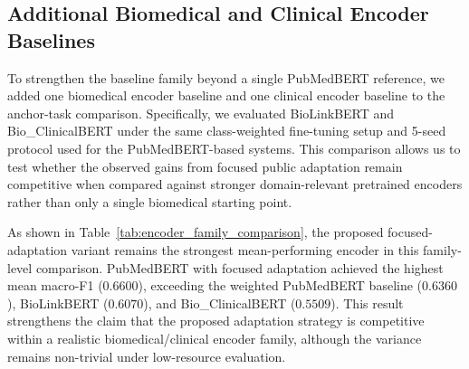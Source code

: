 \documentclass[a4paper,fleqn]{cas-dc}
\begin{document}
\begin{table}[htbp]
	\centering
	\caption{Effect of Sentence-Window Size on Focused Corpus Scale and Anchor-Task Performance}
	\label{tab:window_size_ablation}
\end{table}


\subsection{Additional Biomedical and Clinical Encoder Baselines}
To strengthen the baseline family beyond a single PubMedBERT reference, we added one biomedical encoder baseline and one clinical encoder baseline to the anchor-task comparison. Specifically, we evaluated BioLinkBERT and Bio\_ClinicalBERT under the same class-weighted fine-tuning setup and 5-seed protocol used for the PubMedBERT-based systems. This comparison allows us to test whether the observed gains from focused public adaptation remain competitive when compared against stronger domain-relevant pretrained encoders rather than only a single biomedical starting point.

As shown in Table~\ref{tab:encoder_family_comparison}, the proposed focused-adaptation variant remains the strongest mean-performing encoder in this family-level comparison. PubMedBERT with focused adaptation achieved the highest mean macro-F1 ($0.6600$), exceeding the weighted PubMedBERT baseline ($0.6360$), BioLinkBERT ($0.6070$), and Bio\_ClinicalBERT ($0.5509$). This result strengthens the claim that the proposed adaptation strategy is competitive within a realistic biomedical/clinical encoder family, although the variance remains non-trivial under low-resource evaluation.
\end{document}
